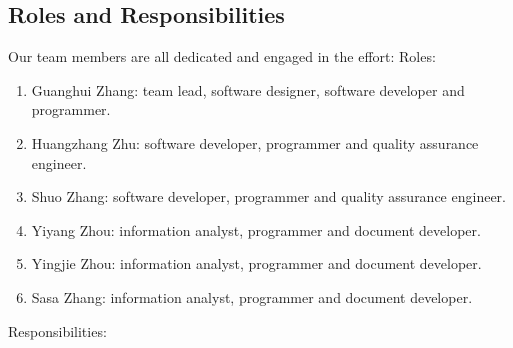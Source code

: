 \documentclass[12pt]{article}
\begin{document}
\subsection{Roles and Responsibilities}
Our team members are all dedicated and engaged in the effort:\newline\newline
Roles:
\begin{enumerate}
    \item Guanghui Zhang:  team lead, software designer, software developer and programmer.
    \item Huangzhang Zhu: software developer, programmer and quality assurance engineer.
    \item Shuo Zhang: software developer, programmer and quality assurance engineer.
    \item Yiyang Zhou: information analyst, programmer and document developer.
    \item Yingjie Zhou: information analyst, programmer and document developer.
    \item Sasa Zhang: information analyst, programmer and document developer. \newline
\end{enumerate}
Responsibilities:
\end{document}
